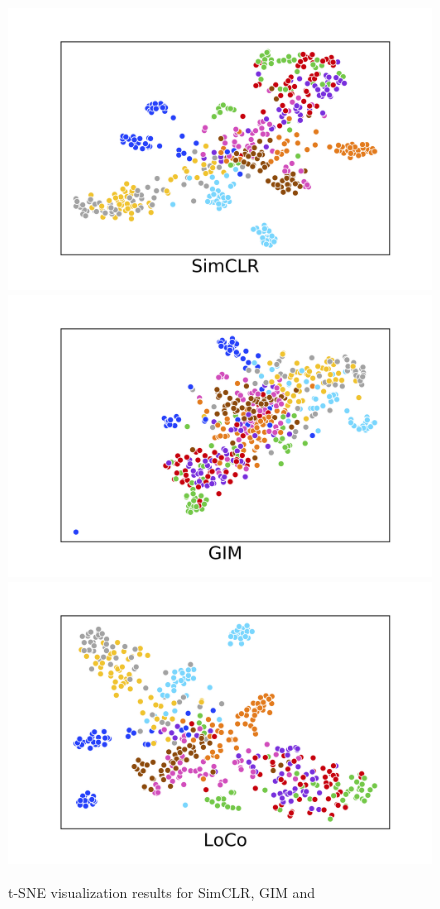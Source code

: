 \iflatexml
    \begin{figure}
    \includegraphics[width=2\linewidth, trim={1.9cm 0 1.5cm 0}, clip]{figures/simclr_tsne.png}
    \includegraphics[width=2\linewidth, trim={1.9cm 0 1.5cm 0}, clip]{figures/gim_tsne.png}
    \includegraphics[width=2\linewidth, trim={1.9cm 0 1.5cm 0}, clip]{figures/loco_tsne.png}
    \caption{t-SNE visualization results for SimCLR, GIM and \ours{}}
    \label{fig:tsne_vis}
    \end{figure}

